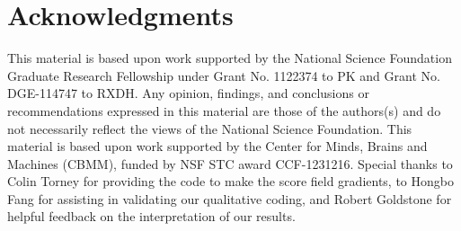 \documentclass[12pt,letterpaper]{article}
\begin{document}
\section{Acknowledgments}

\small

This material is based upon work supported by the National Science
Foundation Graduate Research Fellowship under Grant No. 1122374 to PK
and Grant No. DGE-114747 to RXDH. Any opinion, findings, and
conclusions or recommendations expressed in this material are those of
the authors(s) and do not necessarily reflect the views of the
National Science Foundation.  This material is based upon work
supported by the Center for Minds, Brains and Machines (CBMM), funded
by NSF STC award CCF-1231216.
Special thanks to Colin Torney for providing the code to make the score field gradients, to Hongbo Fang for assisting in validating our qualitative coding, and Robert Goldstone for helpful feedback on the interpretation of our results.

 

\setlength{\bibleftmargin}{.125in}
\setlength{\bibindent}{-\bibleftmargin}

\small{
  
}
\end{document}
